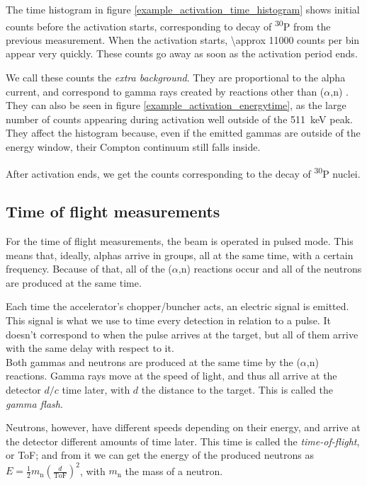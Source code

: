 \documentclass[a4paper,12pt]{report}
\newcommand{\an}{($\alpha$,n) }
\newcommand{\Piso}{\textsuperscript{30}P }
\begin{document}
The time histogram in figure \ref{example_activation_time_histogram} shows initial counts before the activation starts, corresponding to decay of \Piso from the previous measurement.
When the activation starts, \num{\approx 11000} counts per bin appear very quickly.
These counts go away as soon as the activation period ends.

We call these counts the \textit{extra background}.
They are proportional to the alpha current, and correspond to gamma rays created by reactions other than \an.
They can also be seen in figure \ref{example_activation_energytime}, as the large number of counts appearing during activation well outside of the \qty{511}{\keV} peak.
They affect the histogram because, even if the emitted gammas are outside of the energy window, their Compton continuum still falls inside.

After activation ends, we get the counts corresponding to the decay of \Piso nuclei.

\subsection{Time of flight measurements}
For the time of flight measurements, the beam is operated in pulsed mode.
This means that, ideally, alphas arrive in groups, all at the same time, with a certain frequency.	%
Because of that, all of the \an reactions occur and all of the neutrons are produced at the same time.

Each time the accelerator's chopper/buncher acts, an electric signal is emitted.	%
This signal is what we use to time every detection in relation to a pulse.
It doesn't correspond to when the pulse arrives at the target, but all of them arrive with the same delay with respect to it.
\\

Both gammas and neutrons are produced at the same time by the \an reactions.	%
Gamma rays move at the speed of light, and thus all arrive at the detector $d/c$ time later, with $d$ the distance to the target.
This is called the \textit{gamma flash}.

Neutrons, however, have different speeds depending on their energy, and arrive at the detector different amounts of time later.
This time is called the \textit{time-of-flight}, or ToF; and from it we can get the energy of the produced neutrons as $E=\frac{1}{2} m_\text{n} \left( \frac{d}{\text{ToF}} \right)^2$, with $m_\text{n}$ the mass of a neutron.
\\
\end{document}
